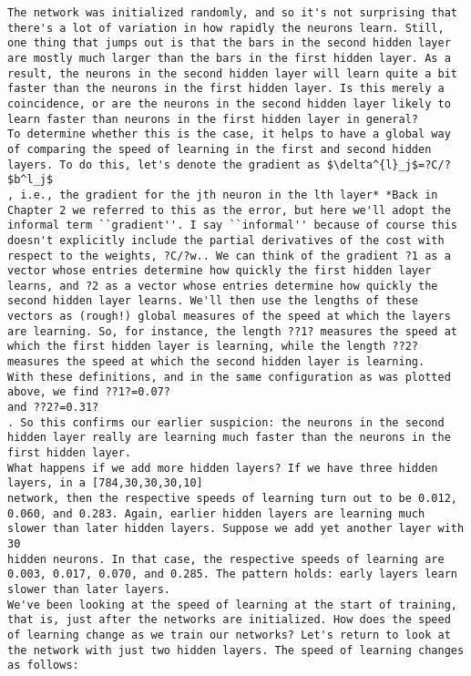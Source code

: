 \begin{lstlisting}
The network was initialized randomly, and so it's not surprising that there's a lot of variation in how rapidly the neurons learn. Still, one thing that jumps out is that the bars in the second hidden layer are mostly much larger than the bars in the first hidden layer. As a result, the neurons in the second hidden layer will learn quite a bit faster than the neurons in the first hidden layer. Is this merely a coincidence, or are the neurons in the second hidden layer likely to learn faster than neurons in the first hidden layer in general?
To determine whether this is the case, it helps to have a global way of comparing the speed of learning in the first and second hidden layers. To do this, let's denote the gradient as $\delta^{l}_j$=?C/?$b^l_j$
, i.e., the gradient for the jth neuron in the lth layer* *Back in Chapter 2 we referred to this as the error, but here we'll adopt the informal term ``gradient''. I say ``informal'' because of course this doesn't explicitly include the partial derivatives of the cost with respect to the weights, ?C/?w.. We can think of the gradient ?1 as a vector whose entries determine how quickly the first hidden layer learns, and ?2 as a vector whose entries determine how quickly the second hidden layer learns. We'll then use the lengths of these vectors as (rough!) global measures of the speed at which the layers are learning. So, for instance, the length ??1? measures the speed at which the first hidden layer is learning, while the length ??2?
measures the speed at which the second hidden layer is learning.
With these definitions, and in the same configuration as was plotted above, we find ??1?=0.07?
and ??2?=0.31?
. So this confirms our earlier suspicion: the neurons in the second hidden layer really are learning much faster than the neurons in the first hidden layer.
What happens if we add more hidden layers? If we have three hidden layers, in a [784,30,30,30,10]
network, then the respective speeds of learning turn out to be 0.012, 0.060, and 0.283. Again, earlier hidden layers are learning much slower than later hidden layers. Suppose we add yet another layer with 30
hidden neurons. In that case, the respective speeds of learning are 0.003, 0.017, 0.070, and 0.285. The pattern holds: early layers learn slower than later layers.
We've been looking at the speed of learning at the start of training, that is, just after the networks are initialized. How does the speed of learning change as we train our networks? Let's return to look at the network with just two hidden layers. The speed of learning changes as follows:


\end{lstlisting}
